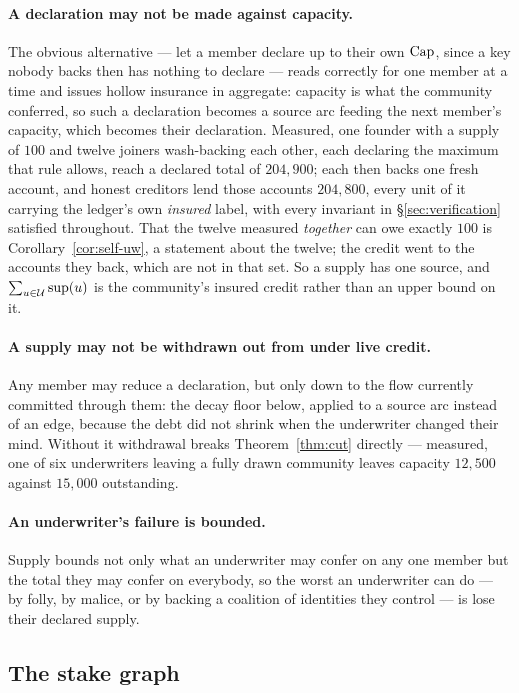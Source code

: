 \paragraph{A declaration may not be made against capacity.} The obvious alternative ---
let a member declare up to their own $\mathrm{Cap}$, since a key nobody backs then has nothing
to declare --- reads correctly for one member at a time and issues hollow insurance in
aggregate: capacity is what the community conferred, so such a declaration becomes a
source arc feeding the next member's capacity, which becomes their declaration. Measured,
one founder with a supply of $100$ and twelve joiners wash-backing each other, each
declaring the maximum that rule allows, reach a declared total of $204{,}900$; each then
backs one fresh account, and honest creditors lend those accounts $204{,}800$, every unit
of it carrying the ledger's own \emph{insured} label, with every invariant in
\S\ref{sec:verification} satisfied throughout. That the twelve measured \emph{together}
can owe exactly $100$ is Corollary~\ref{cor:self-uw}, a statement about the twelve; the
credit went to the accounts they back, which are not in that set. So a supply has one
source, and $\sum_{u\in\mathcal{U}}\mathrm{sup}(u)$ is the community's insured credit rather than an
upper bound on it.

\paragraph{A supply may not be withdrawn out from under live credit.} Any member may
reduce a declaration, but only down to the flow currently committed through them: the
decay floor below, applied to a source arc instead of an edge, because the debt did not
shrink when the underwriter changed their mind. Without it withdrawal breaks
Theorem~\ref{thm:cut} directly --- measured, one of six underwriters leaving a fully drawn
community leaves capacity $12{,}500$ against $15{,}000$ outstanding.

\paragraph{An underwriter's failure is bounded.} Supply bounds not only what an
underwriter may confer on any one member but the total they may confer on everybody, so
the worst an underwriter can do --- by folly, by malice, or by backing a coalition of
identities they control --- is lose their declared supply.

\subsection{The stake graph}

